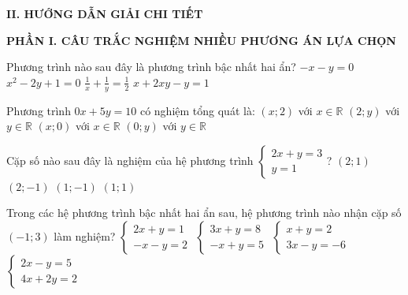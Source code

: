 \documentclass[12pt,a4paper]{article}
\begin{document}
\noindent\textbf{\large II. HƯỚNG DẪN GIẢI CHI TIẾT}

\vspace{2mm}
\noindent\textbf{\large PHẦN I. CÂU TRẮC NGHIỆM NHIỀU PHƯƠNG ÁN LỰA CHỌN}
\vspace{1mm}
\begin{ex}
Phương trình nào sau đây là phương trình bậc nhất hai ẩn?
\choice
{\True $-x - y = 0$}
{$x^2 - 2y + 1 = 0$}
{$\frac{1}{x} + \frac{1}{y} = \frac{1}{2}$}
{$x + 2xy - y = 1$}
\end{ex}

\begin{ex}
Phương trình $0x + 5y = 10$ có nghiệm tổng quát là:
\choice
{\True $(x; 2)$ với $x \in \mathbb{R}$}
{$(2; y)$ với $y \in \mathbb{R}$}
{$(x; 0)$ với $x \in \mathbb{R}$}
{$(0; y)$ với $y \in \mathbb{R}$}
\end{ex}

\begin{ex}
Cặp số nào sau đây là nghiệm của hệ phương trình $\begin{cases} 2x + y = 3 \\ y = 1 \end{cases}$?
\choice
{$(2; 1)$}
{$(2; -1)$}
{$(1; -1)$}
{\True $(1; 1)$}
\end{ex}

\begin{ex}
Trong các hệ phương trình bậc nhất hai ẩn sau, hệ phương trình nào nhận cặp số $(-1; 3)$ làm nghiệm?
\choice
{$\begin{cases} 2x + y = 1 \\ -x - y = 2 \end{cases}$}
{$\begin{cases} 3x + y = 8 \\ -x + y = 5 \end{cases}$}
{\True $\begin{cases} x + y = 2 \\ 3x - y = -6 \end{cases}$}
{$\begin{cases} 2x - y = 5 \\ 4x + 2y = 2 \end{cases}$}
\end{ex}
\end{document}
